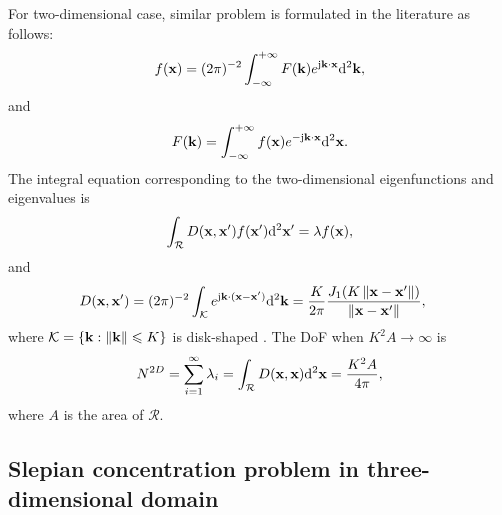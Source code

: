 \documentclass[12pt,draftclsnofoot,journal,onecolumn]{IEEEtran}
\begin{document}
	For two-dimensional case, similar problem is formulated in the literature as follows:
	\begin{equation}
		\begin{aligned}
			f({\bf x})=(2\pi)^{-2}\int_{-\infty}^{+\infty}F({\bf k})e^{{\rm j}{\bf k}\cdot {\bf x}}{\rm d}^2{\bf k},
		\end{aligned}
		\label{eq_2d_fourier}
	\end{equation}
	and
	\begin{equation}
		\begin{aligned}
			F({\bf k}) = \int_{-\infty}^{+\infty}f({\bf x})e^{-{\rm j}{\bf k}\cdot {\bf x}}{\rm d}^2{\bf x}.
		\end{aligned}
	\end{equation}
	The integral equation corresponding to the two-dimensional eigenfunctions and eigenvalues is 
	\begin{equation}
		\begin{aligned}
			\int_{\mathcal{R}}D({\bf x},{\bf x}')f({\bf x}'){\rm d}^2{\bf x}' = \lambda f({\bf x}),
		\end{aligned}
	\end{equation}
	and
	\begin{equation}
		\begin{aligned}
			D({\bf x},{\bf x}') &= (2\pi)^{-2}\int_{\mathcal{K}} e^{{\rm j}{\bf k}\cdot({\bf x}-{\bf x}')}{\rm d}^2{\bf k} = \frac{K}{2\pi} \frac{J_1(K\left\| {\bf x}-{\bf x}' \right\|)}{\left\| {\bf x}-{\bf x}' \right\|},
		\end{aligned}
	\end{equation}
	where $\mathcal{K} = \{{\bf k} : \left\| {\bf k} \right\|\leqslant K\}$ is disk-shaped \cite{beylkin2007grids}. 
	The DoF when $K^2A \rightarrow \infty$ is 
	\begin{equation}
		\begin{aligned}
			N^{2D} = \sum_{i=1}^\infty \lambda_i = \int_{\mathcal{R}}D({\bf x},{\bf x}){\rm d}^2{\bf x} = \frac{K^2A}{4\pi},
		\end{aligned}
		\label{eq_2d_dof}
	\end{equation}
	where $A$ is the area of $\mathcal{R}$. 
	
	\subsection{Slepian concentration problem in three-dimensional domain}
	\label{subsec_3d_slepian}
	
\end{document}
